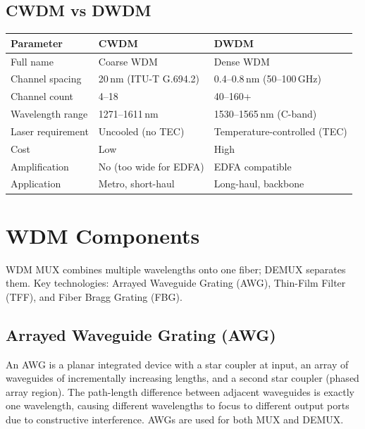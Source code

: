\documentclass[12pt,a4paper]{article}
\renewcommand{\arraystretch}{1.45}
\begin{document}
\subsection{CWDM vs DWDM}
\par\noindent
{\renewcommand{\arraystretch}{1.55}
\begin{tabularx}{\linewidth}{|B{3.5cm}|Y|Y|}
\hline
\textbf{Parameter} & \textbf{CWDM} & \textbf{DWDM} \\
\hline
Full name & Coarse WDM & Dense WDM \\
\hline
Channel spacing & 20\,nm (ITU-T G.694.2) & 0.4--0.8\,nm (50--100\,GHz) \\
\hline
Channel count & 4--18 & 40--160+ \\
\hline
Wavelength range & 1271--1611\,nm & 1530--1565\,nm (C-band) \\
\hline
Laser requirement & Uncooled (no TEC) & Temperature-controlled (TEC) \\
\hline
Cost & Low & High \\
\hline
Amplification & No (too wide for EDFA) & EDFA compatible \\
\hline
Application & Metro, short-haul & Long-haul, backbone \\
\hline
\end{tabularx}}

\section{WDM Components}

\begin{tcolorbox}[defbox, title={\textbf{WDM MUX/DEMUX Devices}}]
WDM MUX combines multiple wavelengths onto one fiber; DEMUX separates them. Key technologies: Arrayed Waveguide Grating (AWG), Thin-Film Filter (TFF), and Fiber Bragg Grating (FBG).
\end{tcolorbox}

\subsection{Arrayed Waveguide Grating (AWG)}
An AWG is a planar integrated device with a star coupler at input, an array of waveguides of incrementally increasing lengths, and a second star coupler (phased array region). The path-length difference between adjacent waveguides is exactly one wavelength, causing different wavelengths to focus to different output ports due to constructive interference. AWGs are used for both MUX and DEMUX.
\end{document}
